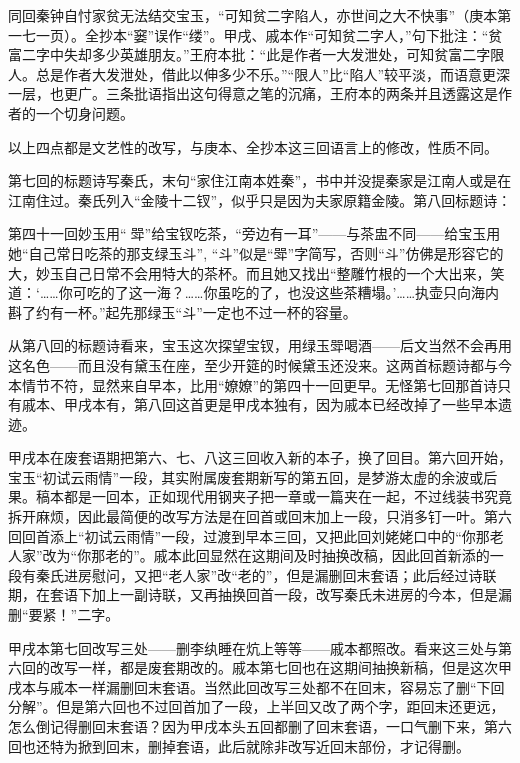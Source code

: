 \par 同回秦钟自忖家贫无法结交宝玉，“可知贫二字陷人，亦世间之大不快事”（庚本第一七一页）。全抄本“窭”误作“缕”。甲戌、戚本作“可知贫二字人，”句下批注：“贫富二字中失却多少英雄朋友。”王府本批：“此是作者一大发泄处，可知贫富二字限人。总是作者大发泄处，借此以伸多少不乐。”“限人”比“陷人”较平淡，而语意更深一层，也更广。三条批语指出这句得意之笔的沉痛，王府本的两条并且透露这是作者的一个切身问题。
\par 以上四点都是文艺性的改写，与庚本、全抄本这三回语言上的修改，性质不同。
\par 第七回的标题诗写秦氏，末句“家住江南本姓秦”，书中并没提秦家是江南人或是在江南住过。秦氏列入“金陵十二钗”，似乎只是因为夫家原籍金陵。第八回标题诗：
\par 第四十一回妙玉用“𤫫\ZhuaSe 斝”给宝钗吃茶，“旁边有一耳”——与茶盅不同——给宝玉用她“自己常日吃茶的那支绿玉斗”, “斗”似是“斝”字简写，否则“斗”仿佛是形容它的大，妙玉自己日常不会用特大的茶杯。而且她又找出“整雕竹根的一个大出来，笑道：‘……你可吃的了这一海？……你虽吃的了，也没这些茶糟塌。'……执壶只向海内斟了约有一杯。”起先那绿玉“斗”一定也不过一杯的容量。
\par 从第八回的标题诗看来，宝玉这次探望宝钗，用绿玉斝喝酒——后文当然不会再用这名色——而且没有黛玉在座，至少开筵的时候黛玉还没来。这两首标题诗都与今本情节不符，显然来自早本，比用“嫽嫽”的第四十一回更早。无怪第七回那首诗只有戚本、甲戌本有，第八回这首更是甲戌本独有，因为戚本已经改掉了一些早本遗迹。
\par 甲戌本在废套语期把第六、七、八这三回收入新的本子，换了回目。第六回开始，宝玉“初试云雨情”一段，其实附属废套期新写的第五回，是梦游太虚的余波或后果。稿本都是一回本，正如现代用钢夹子把一章或一篇夹在一起，不过线装书究竟拆开麻烦，因此最简便的改写方法是在回首或回末加上一段，只消多钉一叶。第六回回首添上“初试云雨情”一段，过渡到早本三回，又把此回刘姥姥口中的“你那老人家”改为“你那老的”。戚本此回显然在这期间及时抽换改稿，因此回首新添的一段有秦氏进房慰问，又把“老人家”改“老的”，但是漏删回末套语；此后经过诗联期，在套语下加上一副诗联，又再抽换回首一段，改写秦氏未进房的今本，但是漏删“要紧！”二字。
\par 甲戌本第七回改写三处——删李纨睡在炕上等等——戚本都照改。看来这三处与第六回的改写一样，都是废套期改的。戚本第七回也在这期间抽换新稿，但是这次甲戌本与戚本一样漏删回末套语。当然此回改写三处都不在回末，容易忘了删“下回分解”。但是第六回也不过回首加了一段，上半回又改了两个字，距回末还更远，怎么倒记得删回末套语？因为甲戌本头五回都删了回末套语，一口气删下来，第六回也还特为掀到回末，删掉套语，此后就除非改写近回末部份，才记得删。
